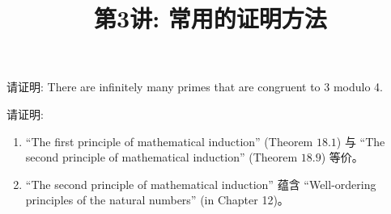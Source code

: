 \documentclass[a4paper, justified]{tufte-handout}
\title{第3讲: 常用的证明方法}
\date{\zhtoday} %
\begin{document}
\maketitle
\noplagiarism %
\begin{abstract}
  \begin{center}{}
  \end{center}
\end{abstract}
\beginrequired

\begin{problem}[UD Problem $5.12$: $3k + 2$]
\end{problem}

\begin{solution}
\end{solution}

\begin{problem}
\end{problem}

\begin{solution}
\end{solution}

\begin{problem}
  请证明: There are infinitely many primes 
  that are congruent to 3 modulo 4.
\end{problem}

\begin{solution}
\end{solution}

\begin{problem}
  请证明: 
  \begin{enumerate}[(1)]
    \item ``The first principle of mathematical induction'' (Theorem $18.1$)
      与 ``The second principle of mathematical induction'' (Theorem $18.9$) 等价。
    \item ``The second principle of mathematical induction'' 蕴含 
      ``Well-ordering principles of the natural numbers'' (in Chapter 12)。
  \end{enumerate}
\end{problem}
\end{document}
